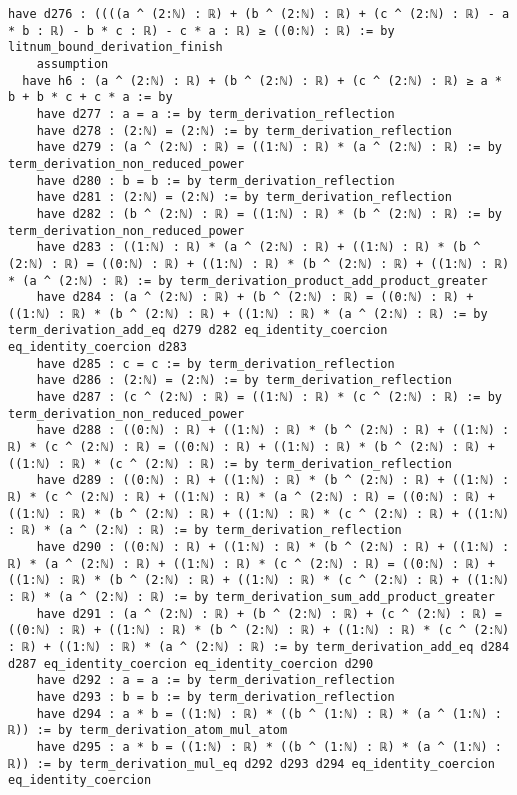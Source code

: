 \documentclass{article}
\begin{document}
\begin{tcolorbox}[colback=white!10, width=\linewidth]
\begin{lstlisting}[language=Lean4]
    have d276 : ((((a ^ (2:ℕ) : ℝ) + (b ^ (2:ℕ) : ℝ) + (c ^ (2:ℕ) : ℝ) - a * b : ℝ) - b * c : ℝ) - c * a : ℝ) ≥ ((0:ℕ) : ℝ) := by litnum_bound_derivation_finish
    assumption
  have h6 : (a ^ (2:ℕ) : ℝ) + (b ^ (2:ℕ) : ℝ) + (c ^ (2:ℕ) : ℝ) ≥ a * b + b * c + c * a := by
    have d277 : a = a := by term_derivation_reflection
    have d278 : (2:ℕ) = (2:ℕ) := by term_derivation_reflection
    have d279 : (a ^ (2:ℕ) : ℝ) = ((1:ℕ) : ℝ) * (a ^ (2:ℕ) : ℝ) := by term_derivation_non_reduced_power
    have d280 : b = b := by term_derivation_reflection
    have d281 : (2:ℕ) = (2:ℕ) := by term_derivation_reflection
    have d282 : (b ^ (2:ℕ) : ℝ) = ((1:ℕ) : ℝ) * (b ^ (2:ℕ) : ℝ) := by term_derivation_non_reduced_power
    have d283 : ((1:ℕ) : ℝ) * (a ^ (2:ℕ) : ℝ) + ((1:ℕ) : ℝ) * (b ^ (2:ℕ) : ℝ) = ((0:ℕ) : ℝ) + ((1:ℕ) : ℝ) * (b ^ (2:ℕ) : ℝ) + ((1:ℕ) : ℝ) * (a ^ (2:ℕ) : ℝ) := by term_derivation_product_add_product_greater
    have d284 : (a ^ (2:ℕ) : ℝ) + (b ^ (2:ℕ) : ℝ) = ((0:ℕ) : ℝ) + ((1:ℕ) : ℝ) * (b ^ (2:ℕ) : ℝ) + ((1:ℕ) : ℝ) * (a ^ (2:ℕ) : ℝ) := by term_derivation_add_eq d279 d282 eq_identity_coercion eq_identity_coercion d283
    have d285 : c = c := by term_derivation_reflection
    have d286 : (2:ℕ) = (2:ℕ) := by term_derivation_reflection
    have d287 : (c ^ (2:ℕ) : ℝ) = ((1:ℕ) : ℝ) * (c ^ (2:ℕ) : ℝ) := by term_derivation_non_reduced_power
    have d288 : ((0:ℕ) : ℝ) + ((1:ℕ) : ℝ) * (b ^ (2:ℕ) : ℝ) + ((1:ℕ) : ℝ) * (c ^ (2:ℕ) : ℝ) = ((0:ℕ) : ℝ) + ((1:ℕ) : ℝ) * (b ^ (2:ℕ) : ℝ) + ((1:ℕ) : ℝ) * (c ^ (2:ℕ) : ℝ) := by term_derivation_reflection
    have d289 : ((0:ℕ) : ℝ) + ((1:ℕ) : ℝ) * (b ^ (2:ℕ) : ℝ) + ((1:ℕ) : ℝ) * (c ^ (2:ℕ) : ℝ) + ((1:ℕ) : ℝ) * (a ^ (2:ℕ) : ℝ) = ((0:ℕ) : ℝ) + ((1:ℕ) : ℝ) * (b ^ (2:ℕ) : ℝ) + ((1:ℕ) : ℝ) * (c ^ (2:ℕ) : ℝ) + ((1:ℕ) : ℝ) * (a ^ (2:ℕ) : ℝ) := by term_derivation_reflection
    have d290 : ((0:ℕ) : ℝ) + ((1:ℕ) : ℝ) * (b ^ (2:ℕ) : ℝ) + ((1:ℕ) : ℝ) * (a ^ (2:ℕ) : ℝ) + ((1:ℕ) : ℝ) * (c ^ (2:ℕ) : ℝ) = ((0:ℕ) : ℝ) + ((1:ℕ) : ℝ) * (b ^ (2:ℕ) : ℝ) + ((1:ℕ) : ℝ) * (c ^ (2:ℕ) : ℝ) + ((1:ℕ) : ℝ) * (a ^ (2:ℕ) : ℝ) := by term_derivation_sum_add_product_greater
    have d291 : (a ^ (2:ℕ) : ℝ) + (b ^ (2:ℕ) : ℝ) + (c ^ (2:ℕ) : ℝ) = ((0:ℕ) : ℝ) + ((1:ℕ) : ℝ) * (b ^ (2:ℕ) : ℝ) + ((1:ℕ) : ℝ) * (c ^ (2:ℕ) : ℝ) + ((1:ℕ) : ℝ) * (a ^ (2:ℕ) : ℝ) := by term_derivation_add_eq d284 d287 eq_identity_coercion eq_identity_coercion d290
    have d292 : a = a := by term_derivation_reflection
    have d293 : b = b := by term_derivation_reflection
    have d294 : a * b = ((1:ℕ) : ℝ) * ((b ^ (1:ℕ) : ℝ) * (a ^ (1:ℕ) : ℝ)) := by term_derivation_atom_mul_atom
    have d295 : a * b = ((1:ℕ) : ℝ) * ((b ^ (1:ℕ) : ℝ) * (a ^ (1:ℕ) : ℝ)) := by term_derivation_mul_eq d292 d293 d294 eq_identity_coercion eq_identity_coercion

\end{lstlisting}
\end{tcolorbox}
\end{document}
